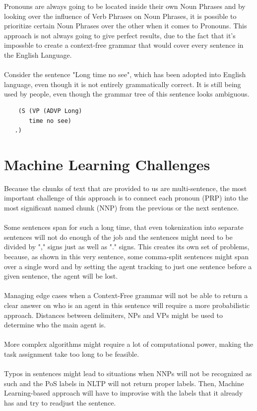 \documentclass{article}
\begin{document}
Pronouns are always going to be located inside their own Noun Phrases and by looking over the influence of Verb Phrases on Noun Phrases, it is possible to prioritize certain Noun Phrases over the other when it comes to Pronouns. This approach is not always going to give perfect results, due to the fact that it's impossble to create a context-free grammar that would cover every sentence in the English Language. \\ \\
Consider the sentence "Long time no see", which has been adopted into English language, even though it is not entirely grammatically correct. It is still being used by people, even though the grammar tree of this sentence looks ambiguous.
\begin{verbatim}
    (S (VP (ADVP Long)
       time no see)
   .)
\end{verbatim}

\section{Machine Learning Challenges}
Because the chunks of text that are provided to us are multi-sentence, the most important challenge of this approach is to connect each pronoun (PRP) into the most significant named chunk (NNP) from the previous or the next sentence. \\ \\
Some sentences span for such a long time, that even tokenization into separate sentences will not do enough of the job and the sentences might need to be divided by "," signs just as well as "." signs. This creates its own set of problems, because, as shown in this very sentence, some comma-split sentences might span over a single word and by setting the agent tracking to just one sentence before a given sentence, the agent will be lost. \\ \\
Managing edge cases when a Context-Free grammar will not be able to return a clear answer on who is an agent in this sentence will require a more probabilistic approach. Distances between delimiters, NPs and VPs might be used to determine who the main agent is. \\ \\
More complex algorithms might require a lot of computational power, making the task assignment take too long to be feasible. \\ \\
Typos in sentences might lead to situations when NNPs will not be recognized as such and the PoS labels in NLTP will not return proper labels. Then, Machine Learning-based approach will have to improvise with the labels that it already has and try to readjust the sentence.
 
\end{document}
